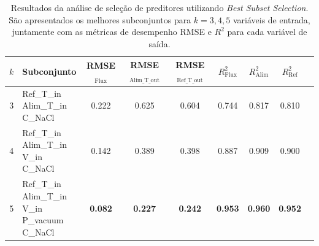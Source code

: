 \begin{table}[H]
\centering
\caption{Resultados da análise de seleção de preditores utilizando \textit{Best Subset Selection}. São apresentados os melhores subconjuntos para $k = 3, 4, 5$ variáveis de entrada, juntamente com as métricas de desempenho RMSE e $R^2$ para cada variável de saída.}
\label{sec:apendice_binning}

\setlength{\tabcolsep}{4pt}

\begin{tabular}{c p{3.5cm} cccc ccc}
\toprule
$k$ 
& Subconjunto 
& RMSE$_{\mathrm{Flux}}$
& RMSE$_{\mathrm{Alim\_T\_out}}$
& RMSE$_{\mathrm{Ref\_T\_out}}$
& $R^2_{\mathrm{Flux}}$
& $R^2_{\mathrm{Alim}}$
& $R^2_{\mathrm{Ref}}$ \\
\midrule

3 &
\shortstack[l]{Ref\_T\_in\\Alim\_T\_in\\C\_NaCl}
& 0.222 & 0.625 & 0.604
& 0.744 & 0.817 & 0.810 \\

4 &
\shortstack[l]{Ref\_T\_in\\Alim\_T\_in\\V\_in\\C\_NaCl}
& 0.142 & 0.389 & 0.398
& 0.887 & 0.909 & 0.900 \\

5 &
\shortstack[l]{Ref\_T\_in\\Alim\_T\_in\\V\_in\\P\_vacuum\\C\_NaCl}
& \textbf{0.082} & \textbf{0.227} & \textbf{0.242}
& \textbf{0.953} & \textbf{0.960} & \textbf{0.952} \\

\bottomrule
\end{tabular}


\end{table}



